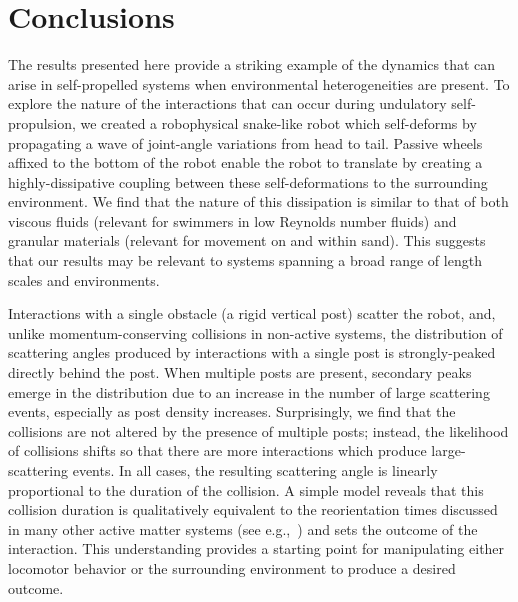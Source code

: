 \documentclass[aps,pre,twocolumn,superscriptaddress]{revtex4-1}
\begin{document}
\section{Conclusions}


The results presented here provide a striking example of the dynamics that can arise in self-propelled systems when environmental heterogeneities are present. To explore the nature of the interactions that can occur during undulatory self-propulsion, we created a robophysical snake-like robot which self-deforms by propagating a wave of joint-angle variations from head to tail. Passive wheels affixed to the bottom of the robot enable the robot to translate by creating a highly-dissipative coupling between these self-deformations to the surrounding environment. We find that the nature of this dissipation is similar to that of both viscous fluids (relevant for swimmers in low Reynolds number fluids) and granular materials (relevant for movement on and within sand). This suggests that our results may be relevant to systems spanning a broad range of length scales and environments.

Interactions with a single obstacle (a rigid vertical post) scatter the robot, and, unlike momentum-conserving collisions in non-active systems, the distribution of scattering angles produced by interactions with a single post is strongly-peaked directly behind the post.  When multiple posts are present, secondary peaks emerge in the distribution due to an increase in the number of large scattering events, especially as post density increases.  
Surprisingly, we find that the collisions are not altered by the presence of multiple posts; instead, the likelihood of collisions shifts so that there are more interactions which produce large-scattering events.  In all cases, the resulting scattering angle is linearly proportional to the duration of the collision. A simple model reveals that this collision duration is qualitatively equivalent to the reorientation times discussed in many other active matter systems (see e.g.,~\cite{bechinger2016active}) and sets the outcome of the interaction. This understanding provides a starting point for manipulating either locomotor behavior or the surrounding environment to produce a desired outcome.
\end{document}
